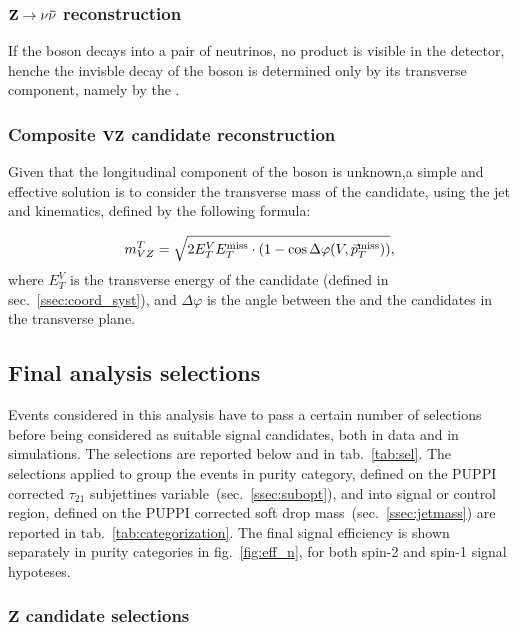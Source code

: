 \subsubsection{$\mathbf{Z \rightarrow \nu \bar{\nu} }$ reconstruction}
\label{ssec:Zcand}

If the \Z boson decays into a pair of neutrinos, no product is visible in the detector, henche the invisble decay of the \Z boson is determined only by its transverse component, namely by the \MET.

\subsubsection{Composite $\mathbf{VZ}$ candidate reconstruction}
\label{ssec:VZcand}

Given that the longitudinal component of the \Z boson is unknown,a simple and effective solution is to consider the transverse mass of the \VZ candidate, using the jet and \met kinematics, defined by the following formula:

\begin{equation}
m_{VZ}^T = \sqrt{ 2 E_T^V E_T^{\text{miss}} \cdot (1 - \cos \Delta \varphi(V,\vec{p}_T^{\text{miss}})) },
\end{equation}
where $E_T^{V}$ is the transverse energy of the \V candidate (defined in sec.~\ref{ssec:coord_syst}), and $\Delta \varphi$ is the angle between the \V and the \Z candidates in the transverse plane.

\subsection{Final analysis selections}
\label{sec:selections}

Events considered in this analysis have to pass a certain number of selections before being considered as suitable signal candidates, both in data and in simulations. The selections are reported below and in tab.~\ref{tab:sel}. The selections applied to group the events in purity category, defined on the PUPPI corrected $\tau_{21}$ subjettines variable~(sec.~\ref{ssec:subopt}), and into signal or control region, defined on the PUPPI corrected soft drop mass~(sec.~\ref{ssec:jetmass}) are reported in tab.~\ref{tab:categorization}. The final signal efficiency is shown separately in purity categories in fig.~\ref{fig:eff_n}, for both spin-2 and spin-1 signal hypoteses.

\subsubsection{$\mathbf{Z}$ candidate selections}

